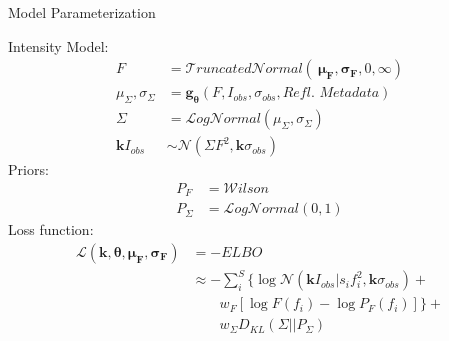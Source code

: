 \documentclass[final]{beamer}
\newlength{\colwidth}
\begin{document}
\begin{frame}[t]
\begin{columns}[t]
\begin{column}{\colwidth}
  \begin{alertblock}{Model Parameterization}
    \begin{minipage}{0.45\textwidth}
    Intensity Model:
    \begin{align*}
        F &= \mathcal{T}runcated\mathcal{N}ormal\left(\ 
            \boldsymbol{\mu_F}, 
            \boldsymbol{\sigma_F}, 
            0, 
            \infty 
            \right) \\
        \mu_\Sigma, \sigma_\Sigma  &= \boldsymbol{g_{\theta}} (F, I_{obs}, \sigma_{obs}, \textit{Refl. Metadata})\\
        \Sigma &= \mathcal{L}og\mathcal{N}ormal\left(
            \mu_\Sigma, 
            \sigma_\Sigma 
            \right) \\
        \boldsymbol{k}I_{obs} &\sim \mathcal{N}\left(\Sigma F^2, \boldsymbol{k}\sigma_{obs}\right)
    \end{align*}
    Priors:
    \begin{align*}
        P_F &= \mathcal{W}ilson \\
        P_\Sigma &= \mathcal{L}og\mathcal{N}ormal(0, 1)
    \end{align*}
    Loss function:
    \begin{align*}
    \mathcal{L} (\boldsymbol{k},\boldsymbol{\theta},\boldsymbol{\mu_F}, \boldsymbol{\sigma_F} )&= -ELBO \\
    &\approx -\sum_i^{S} \bigg\{ \log \mathcal{N}(\mathbf{k}I_{obs}|s_if_i^2, \mathbf{k}\sigma_{obs}) + \\
        & \quad \quad w_F \left[\log F(f_i) - \log P_F(f_i)\right]\bigg\} +\\
        & \quad \quad w_\Sigma D_{KL}(\Sigma || P_\Sigma)
    \end{align*}
    \end{minipage}
    \begin{minipage}{0.5\textwidth}
        \begin{figure}

\end{figure}
\end{minipage}
\end{alertblock}
\end{column}
\end{columns}
\end{frame}
\end{document}
